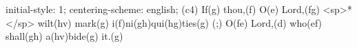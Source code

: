 initial-style: 1;
centering-scheme: english;
(c4) If(g) thou,(f) O(e) Lord,(fg) <sp>*</sp> wilt(hv) mark(g) i(f)ni(gh)qui(hg)ties(g) (;) O(fe) Lord,(d) who(ef) shall(gh) a(hv)bide(g) it.(g)
